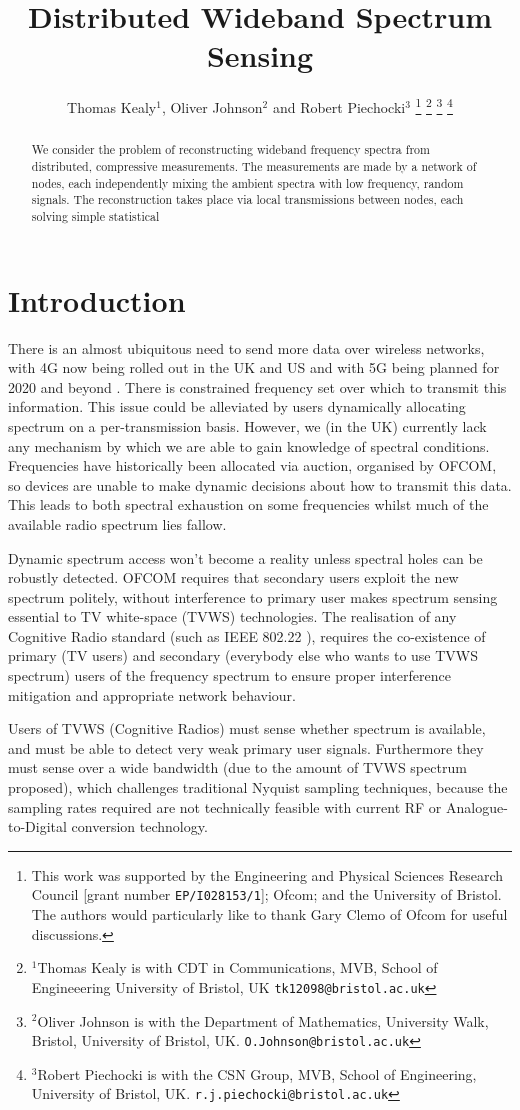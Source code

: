 \documentclass[conference]{IEEEtran}
\title{Distributed Wideband Spectrum Sensing}
\author{Thomas Kealy$^{1}$, Oliver Johnson$^{2}$ and Robert Piechocki$^{3}$%
\thanks{This work was supported by the Engineering and Physical Sciences Research Council [grant number {\tt EP/I028153/1}]; Ofcom; and the University of Bristol. The authors would particularly like to thank Gary Clemo of Ofcom for useful discussions.}%
\thanks{ $^{1}$Thomas Kealy is with CDT in Communications, MVB, School of Engineeering University of Bristol, UK
        {\tt\small tk12098@bristol.ac.uk}}%
\thanks{$^{2}$Oliver Johnson is with the Department of Mathematics, University Walk, Bristol, University of Bristol, UK.
        {\tt\small O.Johnson@bristol.ac.uk}}%
\thanks{$^{3}$Robert Piechocki is with the CSN Group, MVB, School of Engineering, University of Bristol, UK.
        {\tt\small r.j.piechocki@bristol.ac.uk}}%
}
\begin{document}
\maketitle

\begin{abstract}
\noindent We consider the problem of reconstructing wideband frequency spectra from distributed, compressive measurements. The measurements are made by a network of nodes, each independently mixing the ambient spectra with low frequency, random signals. The reconstruction takes place via local transmissions between nodes, each solving simple statistical 
\end{abstract}

\section{Introduction}
There is an almost ubiquitous need to send more data over wireless networks, with 4G now being rolled out in the UK and US and with 5G being planned for 2020 and beyond \cite{Dahlman2014}. There is constrained frequency set over which to transmit this information. This issue could be alleviated by users dynamically allocating spectrum on a per-transmission basis. However, we (in the UK) currently lack any mechanism by which we are able to gain knowledge of spectral conditions. Frequencies have historically been allocated via auction, organised by OFCOM, so devices are unable to make dynamic decisions about how to transmit this data. This leads to both spectral exhaustion on some frequencies whilst much of the available radio spectrum lies fallow.  

Dynamic spectrum access won't become a reality unless spectral holes can be robustly detected. OFCOM requires that secondary users exploit the new spectrum politely, without interference to primary user makes spectrum sensing essential to TV white-space (TVWS) technologies. The realisation of any Cognitive Radio standard (such as IEEE 802.22 \cite{stevenson2009ieee}), requires the co-existence of primary (TV users) and secondary (everybody else who wants to use TVWS spectrum) users of the frequency spectrum to ensure proper interference mitigation and appropriate network behaviour. 

Users of TVWS (Cognitive Radios) must sense whether spectrum is available, and must be able to detect very weak primary user signals. Furthermore they must sense over a wide bandwidth (due to the amount of TVWS spectrum proposed), which challenges traditional Nyquist sampling techniques, because the sampling rates required are not technically feasible with current RF or Analogue-to-Digital conversion technology.
\end{document}
